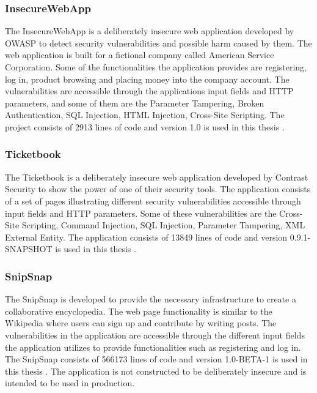 \subsubsection{InsecureWebApp}
The InsecureWebApp is a deliberately insecure web application developed by OWASP to detect security vulnerabilities and possible harm caused by them. The web application is built for a fictional company called American Service Corporation. Some of the functionalities the application provides are registering, log in, product browsing and placing money into the company account. The vulnerabilities are accessible through the applications input fields and HTTP parameters, and some of them are the Parameter Tampering, Broken Authentication, SQL Injection, HTML Injection, Cross-Site Scripting. The project consists of 2913 lines of code and version 1.0 is used in this thesis \parencite{insecure}. 



\subsubsection{Ticketbook}
The Ticketbook is a deliberately insecure web application developed by Contrast Security to show the power of one of their security tools. The application consists of a set of pages illustrating different security vulnerabilities accessible through input fields and HTTP parameters. Some of these vulnerabilities are the Cross-Site Scripting, Command Injection, SQL Injection, Parameter Tampering, XML External Entity. The application consists of 13849 lines of code and version 0.9.1-SNAPSHOT is used in this thesis \parencite{ticketbook, contrast}.



\subsubsection{SnipSnap}
The SnipSnap is developed to provide the necessary infrastructure to create a collaborative encyclopedia. The web page functionality is similar to the Wikipedia \parencite{wikipedia} where users can sign up and contribute by writing posts. The vulnerabilities in the application are accessible through the different input fields the application utilizes to provide functionalities such as registering and log in. The SnipSnap consists of 566173 lines of code and version 1.0-BETA-1 is used in this thesis \parencite{snipsnap}. The application is not constructed to be deliberately insecure and is intended to be used in production.



